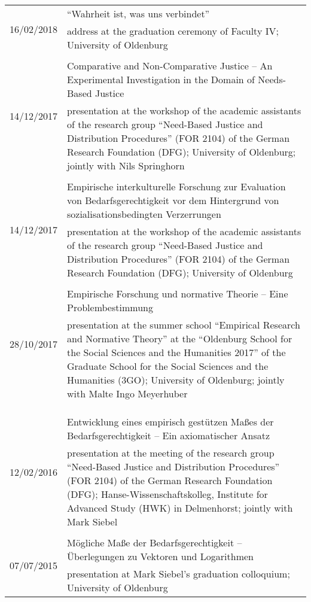 \documentclass[a4paper,10pt]{article}
\begin{document}
\begin{longtable}{p{2.25cm}p{11cm}}
\\
\multirow{2}{2.25cm}{\footnotesize{16/02/2018}} & \enquote{Wahrheit ist, was uns verbindet}\\
& \footnotesize{address at the graduation ceremony of Faculty IV; University of Oldenburg}\\
\\
\multirow{2}{2.25cm}{\footnotesize{14/12/2017}} & Comparative and Non-Comparative Justice -- An Experimental Investigation in the Domain of Needs-Based Justice\\
& \footnotesize{presentation at the workshop of the academic assistants of the research group \enquote{Need-Based Justice and Distribution Procedures} (FOR 2104) of the German Research Foundation (DFG); University of Oldenburg; jointly with Nils Springhorn}\\
\\
\multirow{2}{2.25cm}{\footnotesize{14/12/2017}} & Empirische interkulturelle Forschung zur Evaluation von Bedarfsgerechtigkeit vor dem Hintergrund von sozialisationsbedingten Verzerrungen\\
& \footnotesize{presentation at the workshop of the academic assistants of the research group \enquote{Need-Based Justice and Distribution Procedures} (FOR 2104) of the German Research Foundation (DFG); University of Oldenburg}\\
\\
\multirow{2}{2.25cm}{\footnotesize{28/10/2017}} & Empirische Forschung und normative Theorie -- Eine Problembestimmung\\
& \footnotesize{presentation at the summer school \enquote{Empirical Research and Normative Theory} at the \enquote{Oldenburg School for the Social Sciences and the Humanities 2017} of the Graduate School for the Social Sciences and the Humanities (3GO); University of Oldenburg; jointly with Malte Ingo Meyerhuber}\\
\\
\\
\\
\multirow{2}{2.25cm}{\footnotesize{12/02/2016}} & Entwicklung eines empirisch gestützen Maßes der Bedarfsgerechtigkeit -- Ein axiomatischer Ansatz\\
& \footnotesize{presentation at the meeting of the research group \enquote{Need-Based Justice and Distribution Procedures} (FOR 2104) of the German Research Foundation (DFG); Hanse-Wissenschaftskolleg, Institute for Advanced Study (HWK) in Delmenhorst; jointly with Mark Siebel}\\
\\
\multirow{2}{2.25cm}{\footnotesize{07/07/2015}} & Mögliche Maße der Bedarfsgerechtigkeit -- Überlegungen zu Vektoren und Logarithmen\\
& \footnotesize{presentation at Mark Siebel's graduation colloquium; University of Oldenburg}\\
\end{longtable}
\end{document}
